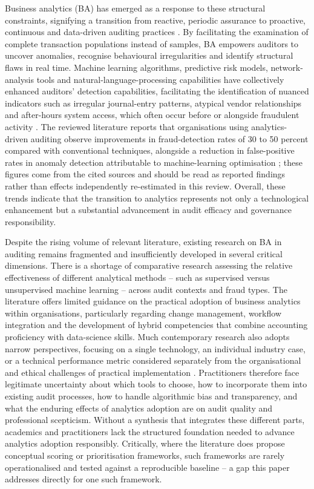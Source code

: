 \documentclass[preprint,12pt]{elsarticle}
\begin{document}
Business analytics (BA) has emerged as a response to these structural constraints, signifying a transition from reactive, periodic assurance to proactive, continuous and data-driven auditing practices \citep{nouri2024,chowdhury2025}. By facilitating the examination of complete transaction populations instead of samples, BA empowers auditors to uncover anomalies, recognise behavioural irregularities and identify structural flaws in real time. Machine learning algorithms, predictive risk models, network-analysis tools and natural-language-processing capabilities have collectively enhanced auditors' detection capabilities, facilitating the identification of nuanced indicators such as irregular journal-entry patterns, atypical vendor relationships and after-hours system access, which often occur before or alongside fraudulent activity \citep{darwish2024,ilori2024,panchapakesan2025}. The reviewed literature reports that organisations using analytics-driven auditing observe improvements in fraud-detection rates of 30 to 50 percent compared with conventional techniques, alongside a reduction in false-positive rates in anomaly detection attributable to machine-learning optimisation \citep{fernandes2019,johnsonrokosu2025}; these figures come from the cited sources and should be read as reported findings rather than effects independently re-estimated in this review. Overall, these trends indicate that the transition to analytics represents not only a technological enhancement but a substantial advancement in audit efficacy and governance responsibility.

Despite the rising volume of relevant literature, existing research on BA in auditing remains fragmented and insufficiently developed in several critical dimensions. There is a shortage of comparative research assessing the relative effectiveness of different analytical methods -- such as supervised versus unsupervised machine learning -- across audit contexts and fraud types. The literature offers limited guidance on the practical adoption of business analytics within organisations, particularly regarding change management, workflow integration and the development of hybrid competencies that combine accounting proficiency with data-science skills. Much contemporary research also adopts narrow perspectives, focusing on a single technology, an individual industry case, or a technical performance metric considered separately from the organisational and ethical challenges of practical implementation \citep{sewpersadh2025}. Practitioners therefore face legitimate uncertainty about which tools to choose, how to incorporate them into existing audit processes, how to handle algorithmic bias and transparency, and what the enduring effects of analytics adoption are on audit quality and professional scepticism. Without a synthesis that integrates these different parts, academics and practitioners lack the structured foundation needed to advance analytics adoption responsibly. Critically, where the literature does propose conceptual scoring or prioritisation frameworks, such frameworks are rarely operationalised and tested against a reproducible baseline -- a gap this paper addresses directly for one such framework.
\end{document}
